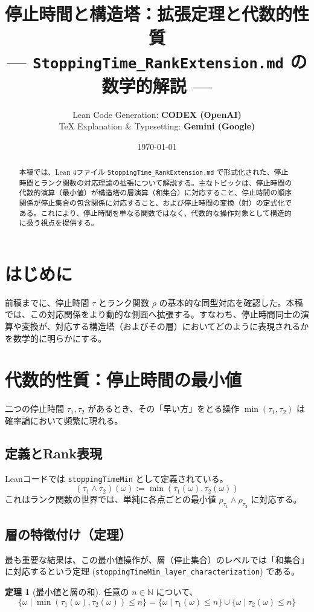 \documentclass[a4paper,11pt]{ltjsarticle}
\title{\textbf{停止時間と構造塔：拡張定理と代数的性質} \\ \large --- \texttt{StoppingTime\_RankExtension.md} の数学的解説 ---}
\author{
    Lean Code Generation: \textbf{CODEX (OpenAI)} \\
    TeX Explanation \& Typesetting: \textbf{Gemini (Google)}
}
\date{\today}
\theoremstyle{definition}
\newtheorem{theorem}[definition]{定理}
\newcommand{\N}{\mathbb{N}}
\newcommand{\Tau}{\tau}
\newcommand{\Rank}{\rho}
\begin{document}
\maketitle

\begin{abstract}
本稿では、Lean 4ファイル \texttt{StoppingTime\_RankExtension.md} で形式化された、停止時間とランク関数の対応理論の拡張について解説する。主なトピックは、停止時間の代数的演算（最小値）が構造塔の層演算（和集合）に対応すること、停止時間の順序関係が停止集合の包含関係に対応すること、および停止時間の変換（射）の定式化である。これにより、停止時間を単なる関数ではなく、代数的な操作対象として構造的に扱う視点を提供する。
\end{abstract}

\tableofcontents

\section{はじめに}
前稿までに、停止時間 $\Tau$ とランク関数 $\Rank$ の基本的な同型対応を確認した。本稿では、この対応関係をより動的な側面へ拡張する。すなわち、停止時間同士の演算や変換が、対応する構造塔（およびその層）においてどのように表現されるかを数学的に明らかにする。

\section{代数的性質：停止時間の最小値}

二つの停止時間 $\Tau_1, \Tau_2$ があるとき、その「早い方」をとる操作 $\min(\Tau_1, \Tau_2)$ は確率論において頻繁に現れる。

\subsection{定義とRank表現}
Leanコードでは \texttt{stoppingTimeMin} として定義されている。
\[
    (\Tau_1 \wedge \Tau_2)(\omega) := \min(\Tau_1(\omega), \Tau_2(\omega))
\]
これはランク関数の世界では、単純に各点ごとの最小値 $\Rank_{\Tau_1} \wedge \Rank_{\Tau_2}$ に対応する。

\subsection{層の特徴付け（定理）}
最も重要な結果は、この最小値操作が、層（停止集合）のレベルでは「和集合」に対応するという定理 (\texttt{stoppingTimeMin\_layer\_characterization}) である。

\begin{theorem}[最小値と層の和]
任意の $n \in \N$ について、
\[
    \{\omega \mid \min(\Tau_1(\omega), \Tau_2(\omega)) \le n\} = \{\omega \mid \Tau_1(\omega) \le n\} \cup \{\omega \mid \Tau_2(\omega) \le n\}
\]
\end{theorem}
\end{document}
